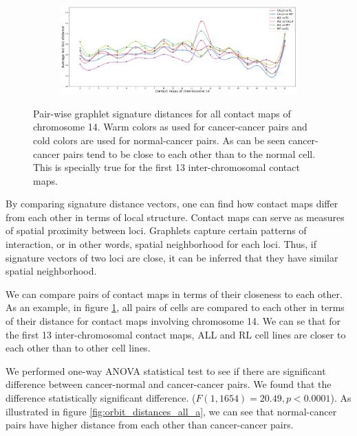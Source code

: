 \documentclass[]{article}
\begin{document}
\begin{figure}
    \centering
    \begin{subfigure}[b]{\textwidth}
        \includegraphics[width=\textwidth]{figures/orbit-distances_chr14.png}
    \end{subfigure}
    \caption{   
        Pair-wise graphlet signature distances for all contact maps of
        chromosome 14. Warm colors as used for cancer-cancer pairs and
        cold colors are used for normal-cancer pairs. As can be seen
        cancer-cancer pairs tend to be close to each other than to the
        normal cell. This is specially true for the first 13 
        inter-chromosomal contact maps.
     }
    \label{fig:orbit_distances_chr14}
\end{figure}


By comparing signature distance vectors, one can find
how contact maps
differ from each other in terms of local structure. 
Contact maps can serve as measures of spatial proximity between
loci. Graphlets capture certain patterns of interaction, or
in other words, spatial neighborhood for each loci. Thus, if
signature vectors of two loci are close,
 it can be inferred that they have 
similar spatial neighborhood.

We can compare pairs of contact maps in terms of their closeness
to each other. 
As an example, in figure
\ref{fig:orbit_distances_chr14}, all pairs of cells are
compared to each other in terms of their distance for contact
maps involving chromosome 14. We can se that 
for the first 13 inter-chromosomal 
contact maps, ALL and RL cell lines are closer to each other
than to other cell lines.

We performed one-way ANOVA statistical test to 
see if there are significant 
difference between cancer-normal and cancer-cancer pairs.
We found that the difference statistically significant difference.
($F(1, 1654) = 20.49, p < 0.0001$).
As illustrated in figure \ref{fig:orbit_distances_all_a},
we can see that normal-cancer pairs have higher distance
from each other than cancer-cancer pairs.
\end{document}
